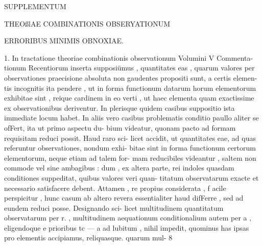 \documentclass[12pt,a4paper]{article}
\begin{document}

\newpage
\begin{center}
\textsc{SUPPLEMENTUM}
\end{center}
THEOßlAE
COMBINATIONIS OBSERYATIONUM
\begin{center}
\textsc{ERRORIBUS MINIMIS OBNOXIAE.}
\end{center}
1.
In tractatione theoriae combinationis observationum Volumini V Commenta-
tionum Recentiorum inserta supposiümus , quantitates eas , quarum valores per
observationes praecisione absoluta non gaudentes propositi sunt, a certis elemen-
tis incognitis ita pendere , ut in forma functionum datarum horum elementorum
exhibitae sint , reique cardinem in eo verti , ut haec elementa quam exactissime
ex observationibus deriventur.
In plerisque quidem casibus suppositio ista immediate locum habet. In aliis
vero casibus problematis conditio paullo aliter se ofFert, ita ut primo aspectu du-
bium videatur, quonam pacto ad formam requisitam reduci possit. Haud raro sci-
licet accidit, ut quantitates eae, ad quas referuntur observationes, nondum exhi-
bitae sint in forma functionum certorum elementorum, neque etiam ad talem for-
mam reducibiles videantur , saltem non commode vel sine ambagibus : dum , ex
altera parte, rei indoles quasdam conditiones suppeditat, quibus valores veri quan-
titatum observatarum exacte et necessario satisfacere debent.
Attamen , re propius considerata , f acile perspicitur , hunc casum ab altero
revera essentialiter haud difFerre , sed ad eundem reduci posse. Designando sci-
licet multitudinem quantitatum observatarum per r. , multitudinem aequationum
conditionalium autem per a , eligendoque e prioribus tc --- a ad lubitum , nihil
impedit, quominus has ipsas pro elementis accipiamus, reliquasque. quarum mul-
8
\end{document}
